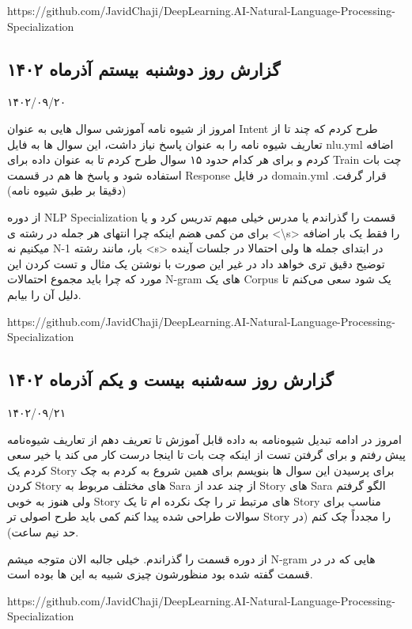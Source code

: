https://github.com/JavidChaji/DeepLearning.AI-Natural-Language-Processing-Specialization


\subsection{گزارش روز دوشنبه بیستم آذر‌ماه ۱۴۰۲}

۱۴۰۲/۰۹/۲۰

امروز از شیوه نامه آموزشی سوال هایی به عنوان Intent طرح کردم که چند تا از تعاریف شیوه نامه را به عنوان پاسخ نیاز داشت، این سوال ها به فایل nlu.yml اضافه کردم و برای هر کدام حدود ۱۵ سوال طرح کردم تا به عنوان داده برای Train چت بات استفاده شود و پاسخ ها هم در قسمت Response در فایل domain.yml قرار گرفت. (دقیقا بر طبق شیوه نامه)

از دوره NLP Specialization قسمت  را گذراندم یا مدرس خیلی مبهم تدریس کرد و یا برای من کمی هضم اینکه چرا انتهای هر جمله در  رشته ی <\textbackslash s> را فقط یک بار اضافه میکنیم نه N-1 بار، مانند رشته <s> در ابتدای جمله ها ولی احتمالا در جلسات آینده توضیح دقیق تری خواهد داد در غیر این صورت با نوشتن یک مثال و تست کردن این مورد که چرا باید مجموع احتمالات N-gram های یک Corpus یک شود سعی می‌کنم تا دلیل آن را بیابم.

https://github.com/JavidChaji/DeepLearning.AI-Natural-Language-Processing-Specialization


\subsection{گزارش روز سه‌شنبه بیست و یکم آذر‌ماه ۱۴۰۲}

۱۴۰۲/۰۹/۲۱

امروز در ادامه تبدیل شیوه‌نامه به داده قابل آموزش تا تعریف دهم از تعاریف شیوه‌نامه پیش رفتم و برای گرفتن تست از اینکه چت بات تا اینجا درست کار می کند یا خیر سعی کردم یک Story برای پرسیدن این سوال ها بنویسم برای همین شروع به کردم به چک کردن Story های مختلف مربوط به Sara  از چند عدد از Story های Sara الگو گرفتم ولی هنوز به خوبی Story های مرتبط تر را چک نکرده ام تا یک Story مناسب برای سوالات طراحی شده پیدا کنم کمی باید طرح اصولی تر Story را مجدداً چک کنم (در حد نیم ساعت).

از دوره  قسمت  را گذراندم. خیلی جالبه الان متوجه میشم N-gram هایی که در  در قسمت  گفته شده بود منظورشون چیزی شبیه به این ها بوده است.

https://github.com/JavidChaji/DeepLearning.AI-Natural-Language-Processing-Specialization


